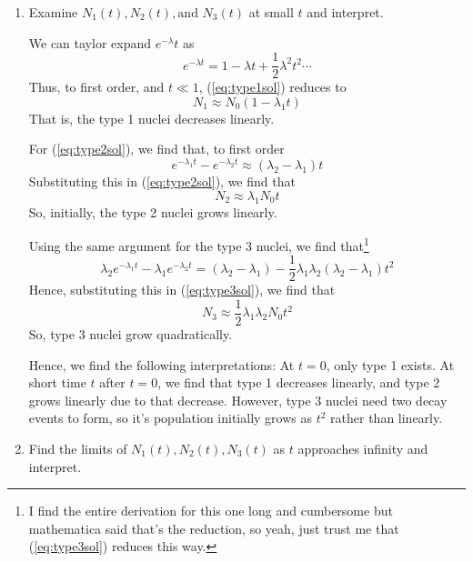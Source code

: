 \documentclass[12pt,a4paper]{article}
\begin{document}
\begin{solution_pset}
\begin{enumerate}[\textbf{(\alph*)}]
				  We can interpret this as the number of nuclei present on the sample
				  is constant over all of time, i.e., 
			  \item Examine $N_1(t),N_2(t),\text{and }N_3(t)$ at small $t$ and interpret.

				  We can taylor expand $e^{-\lambda}t$ as 
				  \[
					  e^{-\lambda t} = 1 -\lambda t + \frac{1}{2}\lambda^2t^2 \cdots
				  \]
				  Thus, to first order, and $t\ll 1$, (\ref{eq:type1sol}) reduces to
				  \[
					  \boxed{
						  N_1 \approx N_0 (1 - \lambda_1 t)
					  }
				  \]
				  That is, the type 1 nuclei decreases linearly.

				  For (\ref{eq:type2sol}), we find that, to first order
				  \[
					  e^{-\lambda_1 t} - e^{-\lambda_2 t} \approx (\lambda_2 - \lambda_1)t
				  \]
				  Substituting this in (\ref{eq:type2sol}), we find that
				  \[
					  \boxed{
					   N_2 \approx \lambda_1 N_0 t
					  }
				  \]
				  So, initially, the type 2 nuclei grows linearly.

				  Using the same argument for the type 3 nuclei, we find that\footnote{I find the
				  entire derivation for this one long and cumbersome but mathematica said that's the
				  reduction, so yeah, just trust me that (\ref{eq:type3sol}) reduces this way.}
				  \[
					  \lambda_2 e^{-\lambda_1 t} - \lambda_1 e^{-\lambda_2 t} 
					  = 
					  (\lambda_2 - \lambda_1) - \frac{1}{2}\lambda_1\lambda_2(\lambda_2 - \lambda_1)t^2 
				  \]
				  Hence, substituting this in (\ref{eq:type3sol}), we find that
				  \[
					  \boxed{
						  N_3 \approx \frac{1}{2}\lambda_1\lambda_2 N_0 t^2 
					  }
				  \]
				  So, type 3 nuclei grow quadratically.

				  Hence, we find the following interpretations: At $t=0$, only type 1 exists.
				  At short time $t$ after $t=0$, we find that type 1 decreases linearly, 
				  and type 2 grows linearly due to that decrease. However, type 3 nuclei 
				  need two decay events to form, so it's population initially grows as $t^2$
				  rather than linearly.

			\item Find the limits of $N_1(t),N_2(t),N_3(t)$ as $t$ approaches infinity
				  and interpret.


\end{enumerate}
\end{solution_pset}
\end{document}
